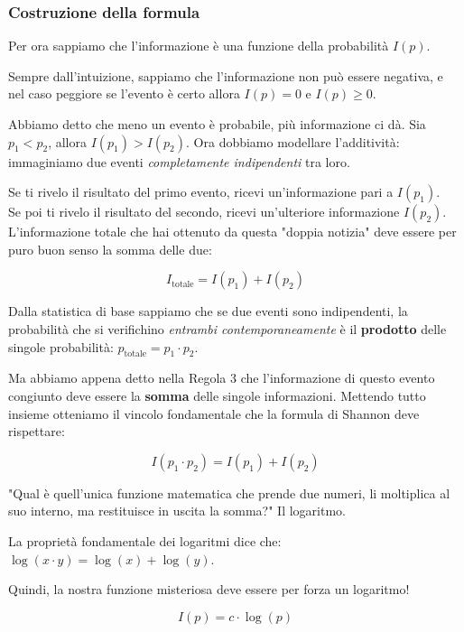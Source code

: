 \subsubsection*{Costruzione della formula}

Per ora sappiamo che l'informazione è una funzione della probabilità $I(p)$.

Sempre dall'intuizione, sappiamo che l'informazione non può essere negativa, e nel caso peggiore se l'evento è certo allora $I(p) = 0$ e $I(p) \ge 0$.

Abbiamo detto che meno un evento è probabile, più informazione ci dà. Sia $p_1 < p_2$, allora $I(p_1) > I(p_2)$. Ora dobbiamo modellare l'additività: immaginiamo due eventi \textit{completamente indipendenti} tra loro.

Se ti rivelo il risultato del primo evento, ricevi un'informazione pari a $I(p_1)$.\\
Se poi ti rivelo il risultato del secondo, ricevi un'ulteriore informazione $I(p_2)$.\\
L'informazione totale che hai ottenuto da questa "doppia notizia" deve essere per puro buon senso la somma delle due:

\begin{equation*}
I_{\text{totale}} = I(p_1) + I(p_2)
\end{equation*}

Dalla statistica di base sappiamo che se due eventi sono indipendenti, la probabilità che si verifichino \textit{entrambi contemporaneamente} è il \textbf{prodotto} delle singole probabilità: $p_{\text{totale}} = p_1 \cdot p_2$.

Ma abbiamo appena detto nella Regola 3 che l'informazione di questo evento congiunto deve essere la \textbf{somma} delle singole informazioni. Mettendo tutto insieme otteniamo il vincolo fondamentale che la formula di Shannon deve rispettare:

\begin{equation*}
I(p_1 \cdot p_2) = I(p_1) + I(p_2)
\end{equation*}

"Qual è quell'unica funzione matematica che prende due numeri, li moltiplica al suo interno, ma restituisce in uscita la somma?" Il logaritmo.

La proprietà fondamentale dei logaritmi dice che: $\log(x \cdot y) = \log(x) + \log(y)$.

Quindi, la nostra funzione misteriosa deve essere per forza un logaritmo!

\begin{equation*}
I(p) = c \cdot \log(p)
\end{equation*}

